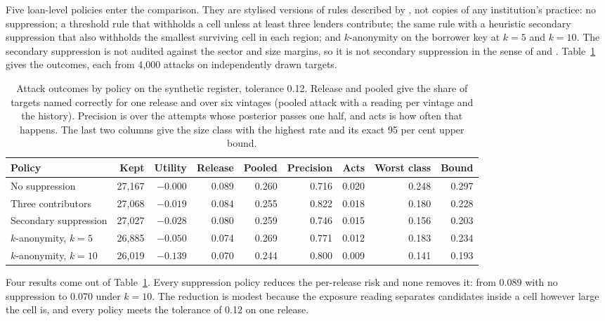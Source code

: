 Five loan-level policies enter the comparison. They are stylised versions of rules
described by \citet{hundepool2012}, not copies of any institution's practice: no
suppression; a threshold rule that withholds a cell unless at least three lenders
contribute; the same rule with a heuristic secondary suppression that also withholds
the smallest surviving cell in each region; and $k$-anonymity on the borrower key at
$k=5$ and $k=10$. The secondary suppression is not audited against the sector and
size margins, so it is not secondary suppression in the sense of \citet{cox1980} and
\citet{fischetti2001}. Table~\ref{c13:tab-eval} gives the outcomes, each from 4{,}000
attacks on independently drawn targets.

\begin{table}[ht]
\centering
\caption{Attack outcomes by policy on the synthetic register, tolerance 0.12. Release
and pooled give the share of targets named correctly for one release and over six
vintages (pooled attack with a reading per vintage and the history). Precision is
over the attempts whose posterior passes one half, and acts is how often that
happens. The last two columns give the size class with the highest rate and its
exact 95 per cent upper bound.}
\label{c13:tab-eval}
\small\setlength{\tabcolsep}{4pt}
\begin{tabular}{lrrrrrrrr}
\toprule
Policy & Kept & Utility & Release & Pooled & Precision & Acts & Worst class & Bound \\
\midrule
No suppression            & 27{,}167 & $-0.000$ & 0.089 & 0.260 & 0.716 & 0.020 & 0.248 & 0.297 \\
Three contributors        & 27{,}068 & $-0.019$ & 0.084 & 0.255 & 0.822 & 0.018 & 0.180 & 0.228 \\
Secondary suppression     & 27{,}027 & $-0.028$ & 0.080 & 0.259 & 0.746 & 0.015 & 0.156 & 0.203 \\
$k$-anonymity, $k=5$      & 26{,}885 & $-0.050$ & 0.074 & 0.269 & 0.771 & 0.012 & 0.183 & 0.234 \\
$k$-anonymity, $k=10$     & 26{,}019 & $-0.139$ & 0.070 & 0.244 & 0.800 & 0.009 & 0.141 & 0.193 \\
\bottomrule
\end{tabular}
\end{table}

Four results come out of Table~\ref{c13:tab-eval}. Every suppression policy reduces
the per-release risk and none removes it: from 0.089 with no suppression to 0.070
under $k=10$. The reduction is modest because the exposure reading separates
candidates inside a cell however large the cell is, and every policy meets the
tolerance of 0.12 on one release.

